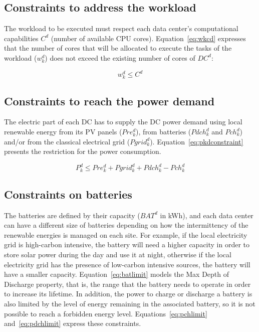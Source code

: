 \subsection{Constraints to address the workload}

The workload to be executed must respect each data center's computational capabilities $C^d$ (number of available CPU cores). Equation~\eqref{eq:wkcd} expresses that the number of cores that will be allocated to execute the tasks of the workload ($w_k^d$) does not exceed the existing number of cores of $DC^d$:

\begin{equation}\label{eq:wkcd}
    w_k^d \leq C^d
\end{equation}


\subsection{Constraints to reach the power demand}

The electric part of each DC has to supply the DC power demand using local renewable energy from its PV panels ($Pre_k^d$), from batteries ($Pdch_k^d$ and $Pch_k^d$) and/or from the classical electrical grid ($Pgrid_k^d$). Equation~\eqref{eq:pkdconstraint} presents the restriction for the power consumption.

\begin{equation} \label{eq:pkdconstraint}
    P^d_k \leq Pre^d_k + Pgrid^d_k + Pdch_k^d - Pch_k^d
\end{equation}

\subsection{Constraints on batteries}

The batteries are defined by their capacity ($BAT^d$ in kWh), and each data center can have a different size of batteries depending on how the intermittency of the renewable energies is managed on each site. For example, if the local electricity grid is high-carbon intensive, the battery will need a higher capacity in order to store solar power during the day and use it at night, otherwise if the local electricity grid has the presence of low-carbon intensive sources, the battery will have a smaller capacity. Equation~\eqref{eq:batlimit} models the Max Depth of Discharge property, that is, the range that the battery needs to operate in order to increase its lifetime. In addition, the power to charge or discharge a battery is also limited by the level of energy remaining in the associated battery, so it is not possible to reach a forbidden energy level. Equations~\eqref{eq:pchlimit} and~\eqref{eq:pdchlimit} express these constraints.

